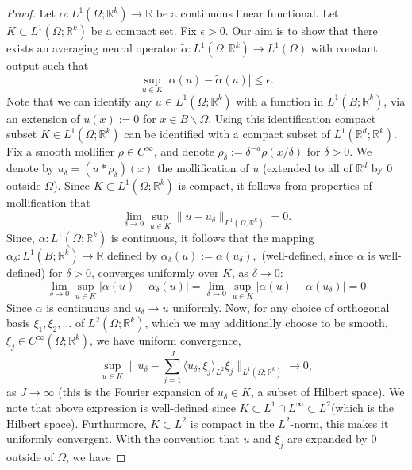 \documentclass[reqno]{amsart}
\theoremstyle{plain}
\theoremstyle{definition}
\newcommand{\bb}[1]{\mathbb{#1}}
\begin{document}
\begin{proof}
    Let $\alpha: L^1(\Omega; \bb R^k) \to \bb R$ be a continuous linear functional. Let $K \subset L^1(\Omega; \bb R^k)$ be a compact set. Fix $\epsilon > 0$. Our aim is to show that there exists an averaging neural operator $\tilde{\alpha} : L^1(\Omega; \bb R^k) \to L^1(\Omega)$ with constant output such that 
    $$ \sup\limits_{u \in K} |\alpha(u) - \tilde{\alpha}(u)| \leq \epsilon.$$
    Note that we can identify any $u \in L^1(\Omega; \bb R^k)$ with a function in $L^1(B; \bb R^k)$, via an extension of $u(x):= 0$ for $x \in B\backslash \Omega$. Using this identification compact subset $K \in L^1(\Omega; \bb R^k)$ can be identified with a compact subset of $L^1(\bb R^d; \bb R^k)$. Fix a smooth mollifier $\rho \in C^\infty$, and denote $\rho_\delta:= \delta^{-d}\rho(x/\delta)$ for $\delta > 0$. We denote by $u_\delta = (u * \rho_\delta)(x)$ the mollification of $u$ (extended to all of $\bb R^d$ by $0$ outside $\Omega$). Since $K \subset L^1(\Omega; \bb R^k)$ is compact, it follows from properties of mollification that
    $$ \lim_{\delta \to 0} \sup\limits_{u \in K}\|u - u_\delta\|_{L^1(\Omega;\bb R^k)} = 0.$$
    Since, $\alpha : L^1(\Omega;\bb R^k)$ is continuous, it follows that the mapping $\alpha_\delta : L^1(B;\bb R^k) \to \bb R$ defined by $\alpha_\delta(u) := \alpha(u_\delta),$ (well-defined, since $\alpha$ is well-defined) for $\delta > 0$, converges uniformly over $K$, as $\delta \to 0$:
    \begin{equation} \label{6}
        \lim_{\delta \to 0}\sup\limits_{u \in K}|\alpha(u) - \alpha_\delta(u)| = \lim_{\delta \to 0}\sup\limits_{u \in K}|\alpha(u) - \alpha(u_\delta)| = 0
    \end{equation}
    Since $\alpha$ is continuous and $u_\delta \to u$ uniformly. Now, for any choice of orthogonal basis $\xi_1, \xi_2, \dots$ of $L^2(\Omega; \bb R^k)$, which we may additionally choose to be smooth, $\xi_j \in C^\infty(\Omega; \bb R^k)$, we have uniform convergence,
    \begin{equation} \label{7}
        \sup_{u \in K} \|u_\delta - \sum_{j=1}^{J}\langle u_\delta, \xi_j\rangle_{L^2} \xi_j\|_{L^1(\Omega; \bb R^k)} \to 0,
    \end{equation}
    as $J \to \infty$ (this is the Fourier expansion of $u_\delta \in K$, a subset of Hilbert space). We note that above expression is well-defined since $K \subset L^1 \cap L^\infty \subset L^2$(which is the Hilbert space). Furthurmore, $K \subset L^2$ is compact in the $L^2$-norm, this makes it uniformly convergent. With the convention that $u$ and $\xi_j$ are expanded by $0$ outside of $\Omega$, we have

\end{proof}
\end{document}
